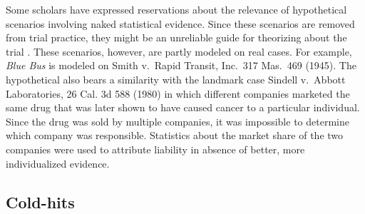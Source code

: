 \documentclass{article}
\begin{document}

Some scholars have expressed reservations about the relevance of hypothetical scenarios involving naked statistical evidence. Since these scenarios are removed from trial practice, they might be an unreliable guide for theorizing about the trial  \citep{Schmalbeck86,dant1988gambling,Allen2001Naturalized}.
These scenarios, however, are partly modeled on real cases. For example, \textit{Blue Bus} is modeled on Smith v.\ Rapid Transit, Inc.\ 317 Mas.\ 469
(1945). The hypothetical also bears a similarity with the landmark case Sindell v.\ Abbott Laboratories, 26 Cal. 3d 588 (1980) in which different companies marketed the same drug that was later shown to have caused cancer to a particular individual. Since the drug was sold by multiple companies, it was impossible to determine which company was responsible. Statistics about the market share of the two companies were used to attribute liability in absence of better, more individualized evidence. 
%
%


 \subsection{Cold-hits}
\end{document}
